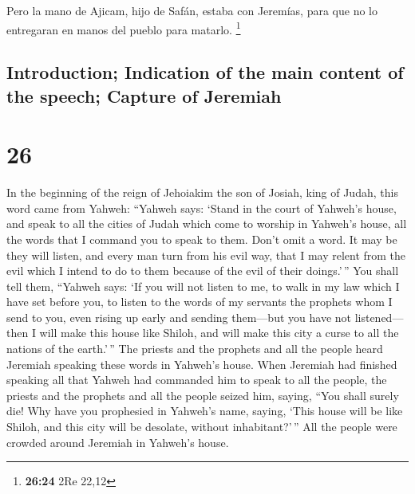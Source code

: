 \begin{paracol}{2}
 Pero la mano de Ajicam, hijo de Safán, estaba con
Jeremías, para que no lo entregaran en manos del pueblo para matarlo.
\footnote{\textbf{26:24} 2Re 22,12}

\switchcolumn
\begin{otherlanguage}{english}

\hypertarget{introduction-indication-of-the-main-content-of-the-speech-capture-of-jeremiah}{%
\subsection{Introduction; Indication of the main content of the speech;
Capture of
Jeremiah}\label{introduction-indication-of-the-main-content-of-the-speech-capture-of-jeremiah}}

\hypertarget{section-51}{%
\section{26}\label{section-51}}

 In the beginning of the reign of Jehoiakim the son of
Josiah, king of Judah, this word came from Yahweh: 
``Yahweh says: `Stand in the court of Yahweh's house, and speak to all
the cities of Judah which come to worship in Yahweh's house, all the
words that I command you to speak to them. Don't omit a word.
 It may be they will listen, and every man turn from his
evil way, that I may relent from the evil which I intend to do to them
because of the evil of their doings.'\,''  You shall tell
them, ``Yahweh says: `If you will not listen to me, to walk in my law
which I have set before you,  to listen to the words of my
servants the prophets whom I send to you, even rising up early and
sending them---but you have not listened---  then I will
make this house like Shiloh, and will make this city a curse to all the
nations of the earth.'\,''  The priests and the prophets
and all the people heard Jeremiah speaking these words in Yahweh's
house.  When Jeremiah had finished speaking all that
Yahweh had commanded him to speak to all the people, the priests and the
prophets and all the people seized him, saying, ``You shall surely die!
 Why have you prophesied in Yahweh's name, saying, `This
house will be like Shiloh, and this city will be desolate, without
inhabitant?'\,'' All the people were crowded around Jeremiah in Yahweh's
house.

\hypertarget{the-trial-before-superiors-the-acquittal-of-jeremiah-the-intercession-of-some-elders-for-him}{%
}
\end{otherlanguage}
\end{paracol}
